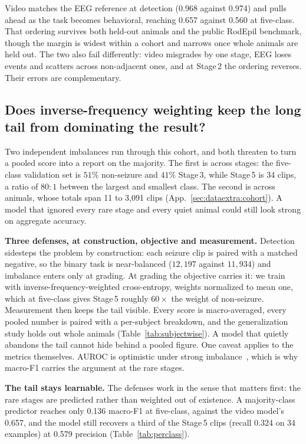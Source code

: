 \begin{takeaway}
\takeawaylabel Video matches the EEG reference at detection (0.968 against 0.974)
and pulls ahead as the task becomes behavioral, reaching 0.657 against 0.560 at five-class. That ordering survives both held-out animals and the public RodEpil benchmark, though the margin is widest within a cohort and narrows once whole animals are held out. The two also fail differently: video misgrades by one stage, EEG loses events and scatters across non-adjacent ones, and at Stage\,2 the ordering reverses. Their errors are complementary.
\end{takeaway}

\subsection{Does inverse-frequency weighting keep the long tail from
dominating the result?}
\label{sec:rq3}

Two independent imbalances run through this cohort, and both threaten to turn a
pooled score into a report on the majority. The first is across stages: the
five-class validation set is $51\%$ non-seizure and $41\%$ Stage\,3, while Stage\,5
is 34 clips, a ratio of $80{:}1$ between the largest and smallest class. The second
is across animals, whose totals span 11 to 3{,}091 clips
(App.~\ref{sec:dataextra:cohort}). A model that ignored every rare stage and every
quiet animal could still look strong on aggregate accuracy.

\noindent\textbf{Three defenses, at construction, objective and measurement.}
Detection sidesteps the problem by construction: each seizure clip is paired with a
matched negative, so the binary task is near-balanced ($12{,}197$ against
$11{,}934$) and imbalance enters only at grading. At grading the objective carries
it: we train with inverse-frequency-weighted cross-entropy, weights normalized to
mean one, which at five-class gives Stage\,5 roughly $60\times$ the weight of
non-seizure. Measurement then keeps the tail visible. Every score is macro-averaged, every pooled number is paired with a per-subject breakdown, and the generalization study holds out whole animals (Table~\ref{tab:subjectwise}). A model that quietly abandons the tail cannot hide behind a pooled figure. One caveat applies to the metrics themselves. AUROC is optimistic under strong imbalance~\cite{saito2015prc}, which is why macro-F1 carries the argument at the rare stages.

\noindent\textbf{The tail stays learnable.}
The defenses work in the sense that matters first: the rare stages are predicted
rather than weighted out of existence. A majority-class predictor reaches only
0.136 macro-F1 at five-class, against the video model's 0.657, and the model still
recovers a third of the Stage\,5 clips (recall 0.324 on 34 examples) at 0.579
precision (Table~\ref{tab:perclass}).

